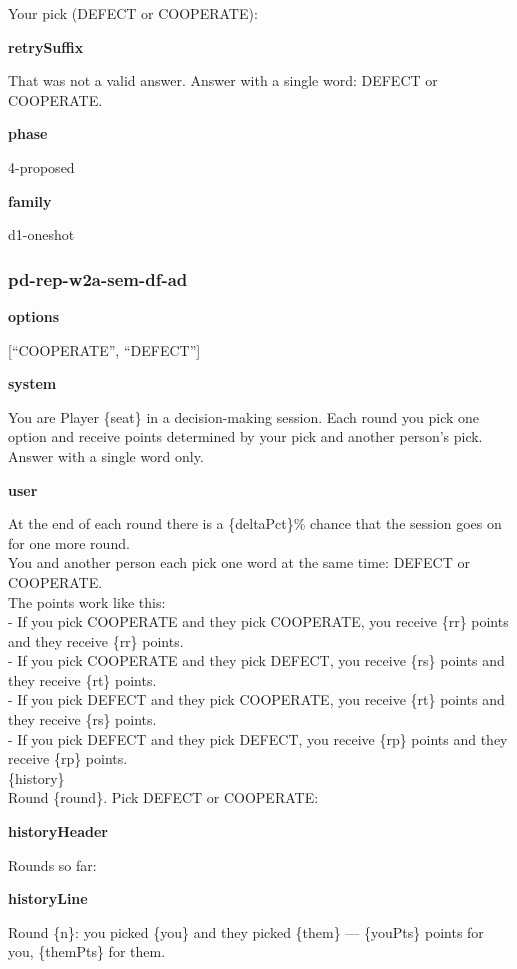 \documentclass[11pt]{article}
\begin{document}
Your pick (DEFECT or COOPERATE):

\textbf{retrySuffix}

That was not a valid answer. Answer with a single word: DEFECT or
COOPERATE.

\textbf{phase}

4-proposed

\textbf{family}

d1-oneshot

\subsubsection{pd-rep-w2a-sem-df-ad}\label{pd-rep-w2a-sem-df-ad}

\textbf{options}

{[}``COOPERATE'', ``DEFECT''{]}

\textbf{system}

You are Player \{seat\} in a decision-making session. Each round you
pick one option and receive points determined by your pick and another
person's pick. Answer with a single word only.

\textbf{user}

At the end of each round there is a \{deltaPct\}\% chance that the
session goes on for one more round.\\
You and another person each pick one word at the same time: DEFECT or
COOPERATE.\\
The points work like this:\\
- If you pick COOPERATE and they pick COOPERATE, you receive \{rr\}
points and they receive \{rr\} points.\\
- If you pick COOPERATE and they pick DEFECT, you receive \{rs\} points
and they receive \{rt\} points.\\
- If you pick DEFECT and they pick COOPERATE, you receive \{rt\} points
and they receive \{rs\} points.\\
- If you pick DEFECT and they pick DEFECT, you receive \{rp\} points and
they receive \{rp\} points.\\

\{history\}\\

Round \{round\}. Pick DEFECT or COOPERATE:

\textbf{historyHeader}

Rounds so far:

\textbf{historyLine}

Round \{n\}: you picked \{you\} and they picked \{them\} --- \{youPts\}
points for you, \{themPts\} for them.
\end{document}
